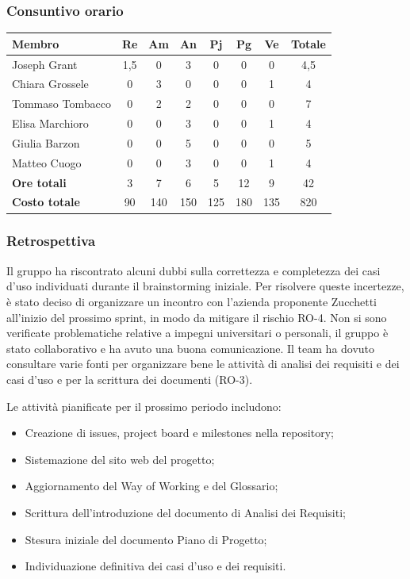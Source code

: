 \documentclass[11pt,a4paper]{article}
\begin{document}
\subsubsection{Consuntivo orario}
\begin{center}
    \begin{tabular}{|l|c|c|c|c|c|c|c|}
        \hline
        \textbf{Membro} & \textbf{Re} & \textbf{Am} & \textbf{An} & \textbf{Pj} & \textbf{Pg} & \textbf{Ve} & \textbf{Totale} \\
        \hline
        Joseph Grant & 1,5 & 0 & 3 & 0 & 0 & 0 & 4,5 \\
        \hline
        Chiara Grossele & 0 & 3 & 0 & 0 & 0 & 1 & 4 \\
        \hline
        Tommaso Tombacco & 0 & 2 & 2 & 0 & 0 & 0 & 7 \\
        \hline
        Elisa Marchioro & 0 & 0 & 3 & 0 & 0 & 1 & 4 \\
        \hline
        Giulia Barzon & 0 & 0 & 5 & 0 & 0 & 0 & 5 \\
        \hline
        Matteo Cuogo & 0 & 0 & 3 & 0 & 0 & 1 & 4 \\
        \hline
        \textbf{Ore totali} & 3 & 7 & 6 & 5 & 12 & 9 & 42 \\
        \hline
        \textbf{Costo totale} & 90 & 140 & 150 & 125 & 180 & 135 & 820 \\
        \hline
    \end{tabular}
\end{center}

\subsubsection{Retrospettiva}
Il gruppo ha riscontrato alcuni dubbi sulla correttezza e completezza dei casi d'uso individuati durante il brainstorming iniziale. Per risolvere queste incertezze, è stato deciso di organizzare un incontro con l'azienda proponente Zucchetti all'inizio del prossimo sprint, in modo da mitigare il rischio RO-4.
Non si sono verificate problematiche relative a impegni universitari o personali, il gruppo è stato collaborativo e ha avuto una buona comunicazione. Il team ha dovuto consultare varie fonti per organizzare bene le attività di analisi dei requisiti e dei casi d'uso e per la scrittura dei documenti (RO-3).

Le attività pianificate per il prossimo periodo includono:
\begin{itemize}
    \item Creazione di issues, project board e milestones nella repository;
    \item Sistemazione del sito web del progetto;
    \item Aggiornamento del Way of Working e del Glossario;
    \item Scrittura dell'introduzione del documento di Analisi dei Requisiti;
    \item Stesura iniziale del documento Piano di Progetto;
    \item Individuazione definitiva dei casi d'uso e dei requisiti.
\end{itemize}
\end{document}
